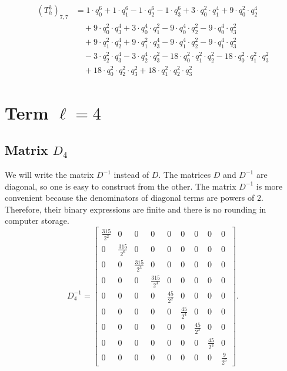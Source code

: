 \begin{align*}(T_{h}^3)_{7,7}&=1\cdot q_0^{6}+1\cdot q_1^{6}-1\cdot q_2^{6}-1\cdot q_3^{6}+3\cdot q_0^{2}\cdot q_1^{4}+9\cdot q_0^{2}\cdot q_2^{4}\\
&\quad +9\cdot q_0^{2}\cdot q_3^{4}+3\cdot q_0^{4}\cdot q_1^{2}-9\cdot q_0^{4}\cdot q_2^{2}-9\cdot q_0^{4}\cdot q_3^{2}\\
&\quad +9\cdot q_1^{2}\cdot q_2^{4}+9\cdot q_1^{2}\cdot q_3^{4}-9\cdot q_1^{4}\cdot q_2^{2}-9\cdot q_1^{4}\cdot q_3^{2}\\
&\quad -3\cdot q_2^{2}\cdot q_3^{4}-3\cdot q_2^{4}\cdot q_3^{2}-18\cdot q_0^{2}\cdot q_1^{2}\cdot q_2^{2}-18\cdot q_0^{2}\cdot q_1^{2}\cdot q_3^{2}\\
&\quad +18\cdot q_0^{2}\cdot q_2^{2}\cdot q_3^{2}+18\cdot q_1^{2}\cdot q_2^{2}\cdot q_3^{2}\end{align*}
\section{Term $\ell=4$}
\subsection{Matrix $D_4$}
We will write the matrix $D^{-1}$ instead of $D$. The matrices $D$ and $D^{-1}$ are diagonal, so one is easy to construct from the other. The matrix $D^{-1}$ is more convenient because the denominators of diagonal terms are powers of $2$. Therefore, their binary expressions are finite and there is no rounding in computer storage.\[D_4^{-1}=\left[\begin{array}{ccccccccc}
\frac{315}{2^{2}} & 0 & 0 & 0 & 0 & 0 & 0 & 0 & 0\\
0 & \frac{315}{2^{6}} & 0 & 0 & 0 & 0 & 0 & 0 & 0\\
0 & 0 & \frac{315}{2^{3}} & 0 & 0 & 0 & 0 & 0 & 0\\
0 & 0 & 0 & \frac{315}{2^{3}} & 0 & 0 & 0 & 0 & 0\\
0 & 0 & 0 & 0 & \frac{45}{2^{2}} & 0 & 0 & 0 & 0\\
0 & 0 & 0 & 0 & 0 & \frac{45}{2^{4}} & 0 & 0 & 0\\
0 & 0 & 0 & 0 & 0 & 0 & \frac{45}{2^{3}} & 0 & 0\\
0 & 0 & 0 & 0 & 0 & 0 & 0 & \frac{45}{2^{3}} & 0\\
0 & 0 & 0 & 0 & 0 & 0 & 0 & 0 & \frac{9}{2^{6}}
\end{array}\right].\]
